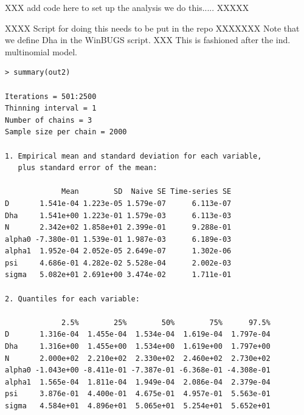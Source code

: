 XXX add code here
to set up the analysis we do this.....
XXXXX

XXXX Script for doing this needs to be put in the repo XXXXXXX
Note that we define Dha in the WinBUGS script.
XXX This is fashioned after the ind. multinomial model.

{\small
\begin{verbatim}
> summary(out2)

Iterations = 501:2500
Thinning interval = 1
Number of chains = 3
Sample size per chain = 2000

1. Empirical mean and standard deviation for each variable,
   plus standard error of the mean:

             Mean        SD  Naive SE Time-series SE
D       1.541e-04 1.223e-05 1.579e-07      6.113e-07
Dha     1.541e+00 1.223e-01 1.579e-03      6.113e-03
N       2.342e+02 1.858e+01 2.399e-01      9.288e-01
alpha0 -7.380e-01 1.539e-01 1.987e-03      6.189e-03
alpha1  1.952e-04 2.052e-05 2.649e-07      1.302e-06
psi     4.686e-01 4.282e-02 5.528e-04      2.002e-03
sigma   5.082e+01 2.691e+00 3.474e-02      1.711e-01

2. Quantiles for each variable:

             2.5%        25%        50%        75%      97.5%
D       1.316e-04  1.455e-04  1.534e-04  1.619e-04  1.797e-04
Dha     1.316e+00  1.455e+00  1.534e+00  1.619e+00  1.797e+00
N       2.000e+02  2.210e+02  2.330e+02  2.460e+02  2.730e+02
alpha0 -1.043e+00 -8.411e-01 -7.387e-01 -6.368e-01 -4.308e-01
alpha1  1.565e-04  1.811e-04  1.949e-04  2.086e-04  2.379e-04
psi     3.876e-01  4.400e-01  4.675e-01  4.957e-01  5.563e-01
sigma   4.584e+01  4.896e+01  5.065e+01  5.254e+01  5.652e+01
\end{verbatim}
}

